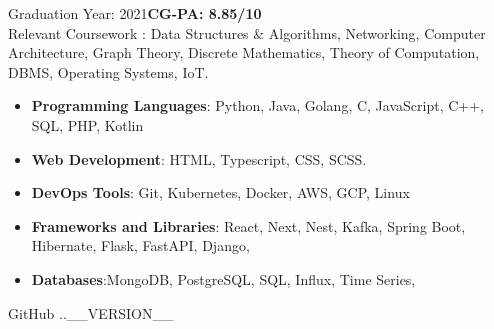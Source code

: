 \documentclass[10pt,a4paper,ragged2e]{classes/altacv}
\begin{document}


Graduation Year: 2021\hspace{5mm}\textbf{CG-PA: 8.85/10 }\\
\smallskip
Relevant Coursework : Data Structures \& Algorithms, Networking, Computer Architecture, Graph Theory, Discrete Mathematics, Theory of Computation, DBMS, Operating Systems, IoT.



\smallskip
\begin{itemize}
\item \textbf{Programming Languages}: Python, Java, Golang, C, JavaScript, C++, SQL, PHP, Kotlin
\smallskip
\item \textbf{Web Development}: HTML, Typescript, CSS, SCSS.
\smallskip
\item \textbf{DevOps Tools}: Git, Kubernetes, Docker, AWS, GCP, Linux
\smallskip
\item \textbf{Frameworks and Libraries}: React, Next, Nest, Kafka, Spring Boot, Hibernate, Flask, FastAPI, Django, 
\smallskip
\item \textbf{Databases}:MongoDB, PostgreSQL, SQL, Influx, Time Series,  
\smallskip
\end{itemize}

\smallskip
\begin{footnotesize}
GitHub \number \month .\number\year.__VERSION__
\end{footnotesize}
\clearpage
\end{document}
